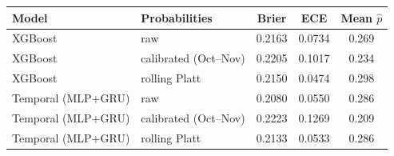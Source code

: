 \begin{tabular}{llccc}
\toprule
Model & Probabilities & Brier & ECE & Mean $\hat p$ \\
\midrule
XGBoost & raw & 0.2163 & 0.0734 & 0.269 \\
XGBoost & calibrated (Oct--Nov) & 0.2205 & 0.1017 & 0.234 \\
XGBoost & rolling Platt & 0.2150 & 0.0474 & 0.298 \\
\midrule
Temporal (MLP+GRU) & raw & 0.2080 & 0.0550 & 0.286 \\
Temporal (MLP+GRU) & calibrated (Oct--Nov) & 0.2223 & 0.1269 & 0.209 \\
Temporal (MLP+GRU) & rolling Platt & 0.2133 & 0.0533 & 0.286 \\
\bottomrule
\end{tabular}
